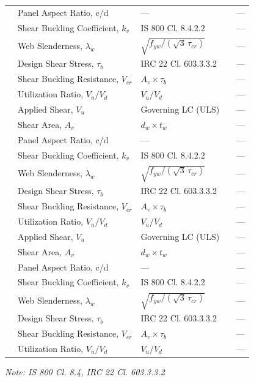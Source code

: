 \documentclass[12pt,a4paper]{report}
\numberwithin{figure}{chapter}
\begin{document}
\begin{longtable}{|C{2.25cm}|L{3.02cm}|L{3.56cm}|C{2.16cm}|C{2.25cm}|}
 & Panel Aspect Ratio, c/d & --- &  & --- \\*
 & Shear Buckling Coefficient, $k_v$ & IS 800 Cl. 8.4.2.2 &  & --- \\*
 & Web Slenderness, $\lambda_w$ & $\sqrt{f_{yw}/(\sqrt{3}\,\tau_{cr})}$ &  & --- \\*
 & Design Shear Stress, $\tau_b$ & IRC 22 Cl. 603.3.3.2 &  & --- \\*
 & Shear Buckling Resistance, $V_{cr}$ & $A_v \times \tau_b$ &  & --- \\*
 & Utilization Ratio, $V_u / V_d$ & $V_u / V_d$ &  & --- \\
\hline
{}
 & Applied Shear, $V_u$ & Governing LC (ULS) &  & --- \\*
 & Shear Area, $A_v$ & $d_w \times t_w$ &  & --- \\*
 & Panel Aspect Ratio, c/d & --- &  & --- \\*
 & Shear Buckling Coefficient, $k_v$ & IS 800 Cl. 8.4.2.2 &  & --- \\*
 & Web Slenderness, $\lambda_w$ & $\sqrt{f_{yw}/(\sqrt{3}\,\tau_{cr})}$ &  & --- \\*
 & Design Shear Stress, $\tau_b$ & IRC 22 Cl. 603.3.3.2 &  & --- \\*
 & Shear Buckling Resistance, $V_{cr}$ & $A_v \times \tau_b$ &  & --- \\*
 & Utilization Ratio, $V_u / V_d$ & $V_u / V_d$ &  & --- \\
\hline
{}
 & Applied Shear, $V_u$ & Governing LC (ULS) &  & --- \\*
 & Shear Area, $A_v$ & $d_w \times t_w$ &  & --- \\
\hline
{}
 & Panel Aspect Ratio, c/d & --- &  & --- \\*
 & Shear Buckling Coefficient, $k_v$ & IS 800 Cl. 8.4.2.2 &  & --- \\*
 & Web Slenderness, $\lambda_w$ & $\sqrt{f_{yw}/(\sqrt{3}\,\tau_{cr})}$ &  & --- \\*
 & Design Shear Stress, $\tau_b$ & IRC 22 Cl. 603.3.3.2 &  & --- \\*
 & Shear Buckling Resistance, $V_{cr}$ & $A_v \times \tau_b$ &  & --- \\*
 & Utilization Ratio, $V_u / V_d$ & $V_u / V_d$ &  & --- \\
\hline
\end{longtable}
\noindent\textit{Note: IS 800 Cl. 8.4, IRC 22 Cl. 603.3.3.2}
\end{document}
